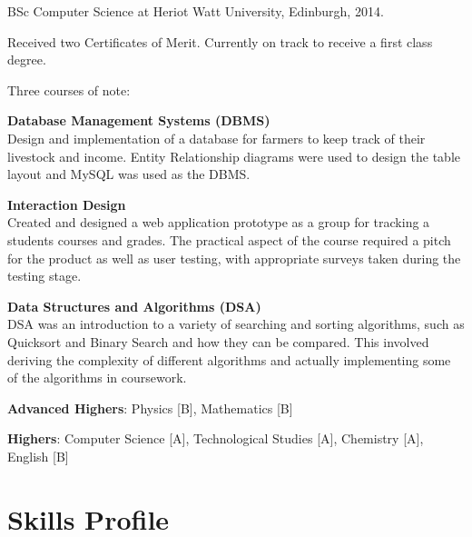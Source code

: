 \documentclass[11pt,a4paper]{article}
\renewenvironment{itemize}{
  \begin{list}{}{
    \setlength{\leftmargin}{1em}
    \setlength{\itemsep}{0.25em}
    \setlength{\parskip}{0pt}
    \setlength{\parsep}{0.25em}
    \renewcommand{\labelitemi}{$\bullet$}
  }
}{
  \end{list}
}
\begin{document}
\begin{itemize}
  \item BSc Computer Science at Heriot Watt University, Edinburgh, 2014.

    Received two Certificates of Merit. Currently on track to receive a first class degree.

    Three courses of note:
    \begin{itemize}
        \item \textbf{Database Management Systems (DBMS)} \\
            Design and implementation of a database for farmers to keep track of their livestock and income.
            Entity Relationship diagrams were used to design the table layout and MySQL was used as the DBMS.
        \item \textbf{Interaction Design} \\
            Created and designed a web application prototype as a group for tracking a students courses and grades. 
            The practical aspect of the course required a pitch for the product as well as user testing, with appropriate
            surveys taken during the testing stage.
        \item \textbf{Data Structures and Algorithms (DSA)} \\
            DSA was an introduction to a variety of searching and sorting algorithms, such as Quicksort and Binary Search and how they can be compared.
            This involved deriving the complexity of different algorithms and actually implementing some of
            the algorithms in coursework.
    \end{itemize}

    \begin{itemize}
        \item \textbf{Advanced Highers}: Physics [B], Mathematics [B]
        \item \textbf{Highers}: Computer Science [A], Technological Studies [A], Chemistry [A], English [B]
    \end{itemize}
\end{itemize}

\section*{Skills Profile}
\end{document}
